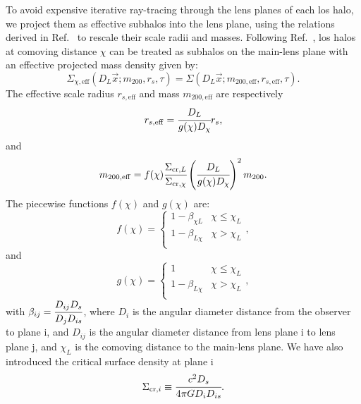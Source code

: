 To avoid expensive iterative ray-tracing through the lens planes of each \gls*{los} halo, we project them as effective subhalos into the lens plane, using the relations derived in Ref.~\cite{CaganSengul:2020nat} to rescale their scale radii and masses. Following Ref.~\cite{CaganSengul:2020nat}, \gls*{los} halos at comoving distance $\chi$ can be treated as subhalos on the main-lens plane with an effective projected mass density given by:
\begin{equation}
    \Sigma_{\chi, \mathrm{eff}}(D_L\vec{x};m_{200},r_s,\tau)= \Sigma(D_L\vec{x};m_{200,\mathrm{eff}},r_{s,\mathrm{eff}},\tau).
\end{equation}
The effective scale radius $r_{s,\mathrm{eff}}$ and mass $m_{200,\mathrm{eff}}$ are respectively
\begin{equation}
    r_{s,\mathrm{eff}}=\cfrac{D_L}{g(\chi)D_\chi}r_s,
\end{equation}
and
\begin{equation}
    m_{200,\mathrm{eff}}=f(\chi)\cfrac{\Sigma_{\mathrm{cr}, L}}{\Sigma_{\mathrm{cr}, \chi}}\left(\cfrac{D_L}{g(\chi)D_\chi}\right)^2m_{200}.
\end{equation}
The piecewise functions $f(\chi)$ and $g(\chi)$ are:
\begin{equation}
    f(\chi)= \begin{cases}
            1-\beta_{\chi L} & \chi \leq \chi_L \\
            1-\beta_{L\chi}  & \chi > \chi_L \\
            \end{cases},
\end{equation}
and
\begin{equation}
    g(\chi)= \begin{cases}
            1 & \chi \leq \chi_L \\
            1-\beta_{L\chi}  & \chi > \chi_L \\
            \end{cases},
\end{equation}
with $\beta_{ij}=\cfrac{D_{ij}D_s}{D_jD_{is}}$, where $D_i$ is the angular diameter distance from the observer to plane i, and $D_{ij}$ is the angular diameter distance from lens plane i to lens plane j, and $\chi_L$ is the comoving distance to the main-lens plane.
We have also introduced the critical surface density at plane i
\begin{equation}
    \Sigma_{\mathrm{cr}, i}\equiv \cfrac{c^2D_s}{4\pi G D_i D_{is}}.
\end{equation}

